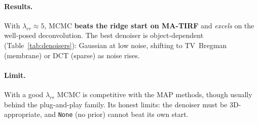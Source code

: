 \paragraph{Results.}
With $\lambda_{rr}\approx5$, MCMC \textbf{beats the ridge start on MA-TIRF} and \emph{excels} on the
well-posed deconvolution. The best denoiser is object-dependent (Table~\ref{tab:denoisers}):
Gaussian at low noise, shifting to TV~Bregman (membrane) or DCT (sparse) as noise rises.

\paragraph{Limit.}
With a good $\lambda_{rr}$ MCMC is competitive
with the MAP methods, though usually behind the plug-and-play family. Its honest limits: the
denoiser must be 3D-appropriate, and \texttt{None} (no prior) cannot beat its own start.
